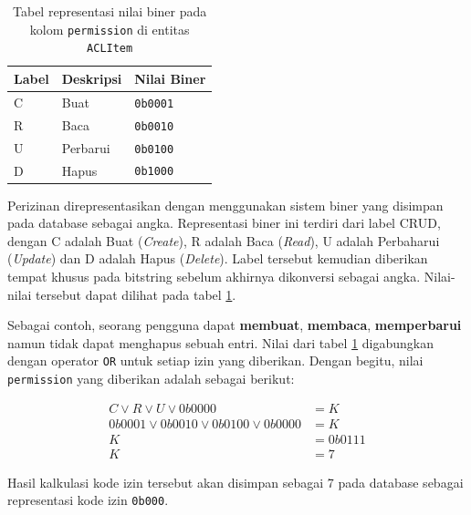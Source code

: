     \begin{table}[H]
        \centering
        \begin{tabular}{|l|l|l|}
        \hline
        Label & Deskripsi & Nilai Biner \\ \hline
        C     & Buat      & \texttt{0b0001}        \\ \hline
        R     & Baca      & \texttt{0b0010}        \\ \hline
        U     & Perbarui  & \texttt{0b0100}        \\ \hline
        D     & Hapus     & \texttt{0b1000}        \\ \hline
        \end{tabular}
        \caption{Tabel representasi nilai biner pada kolom \texttt{permission}
        di entitas \texttt{ACLItem}}
        \label{tab:aclitem_level}
    \end{table}
        
    
    Perizinan direpresentasikan dengan menggunakan sistem biner yang disimpan
    pada database sebagai angka. Representasi biner ini terdiri dari label CRUD,
    dengan C adalah Buat (\textit{Create}), R adalah Baca (\textit{Read}), U
    adalah Perbaharui (\textit{Update}) dan D adalah Hapus (\textit{Delete}).
    Label tersebut kemudian diberikan tempat khusus pada bitstring sebelum
    akhirnya dikonversi sebagai angka. Nilai-nilai tersebut dapat dilihat pada
    tabel \ref{tab:aclitem_level}.
    
    
    Sebagai contoh, seorang pengguna dapat \textbf{membuat}, \textbf{membaca},
    \textbf{memperbarui} namun tidak dapat menghapus sebuah entri. Nilai dari
    tabel \ref{tab:aclitem_level} digabungkan dengan operator \texttt{OR} untuk
    setiap izin yang diberikan. Dengan begitu, nilai \texttt{permission} yang
    diberikan adalah sebagai berikut:
    
    \begin{subequations}
        \begin{align}
            C \vee R \vee U \vee 0b0000 &= K\\
            0b0001 \vee 0b0010 \vee 0b0100 \vee 0b0000 &= K \\
            K &= 0b0111 \\
            K &= 7
        \end{align}
    \end{subequations}
    
    Hasil kalkulasi kode izin tersebut akan disimpan sebagai 7 pada database
    sebagai representasi kode izin \texttt{0b000}. 
    
